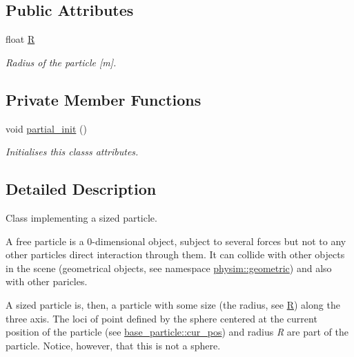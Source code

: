 \subsection*{Public Attributes}
\begin{DoxyCompactItemize}
\item 
\mbox{\label{classphysim_1_1particles_1_1sized__particle_ac67d5df84b91bb12152c8691dd43e98c}} 
float \hyperlink{classphysim_1_1particles_1_1sized__particle_ac67d5df84b91bb12152c8691dd43e98c}{R}
\begin{DoxyCompactList}\small\item\em Radius of the particle \mbox{[}m\mbox{]}. \end{DoxyCompactList}\end{DoxyCompactItemize}
\subsection*{Private Member Functions}
\begin{DoxyCompactItemize}
\item 
void \hyperlink{classphysim_1_1particles_1_1sized__particle_a30eee2e3b0c0cf9e6f56a21e10a424f3}{partial\+\_\+init} ()
\begin{DoxyCompactList}\small\item\em Initialises this class\textquotesingle{}s attributes. \end{DoxyCompactList}\end{DoxyCompactItemize}


\subsection{Detailed Description}
Class implementing a sized particle. 

A free particle is a 0-\/dimensional object, subject to several forces but not to any other particle\textquotesingle{}s direct interaction through them. It can collide with other objects in the scene (geometrical objects, see namespace \hyperlink{namespacephysim_1_1geometric}{physim\+::geometric}) and also with other paricles.

A sized particle is, then, a particle with some size (the radius, see \hyperlink{classphysim_1_1particles_1_1sized__particle_ac67d5df84b91bb12152c8691dd43e98c}{R}) along the three axis. The loci of point defined by the sphere centered at the current position of the particle (see \hyperlink{classphysim_1_1particles_1_1base__particle_a6298a121dea043741e5d3722386163c6}{base\+\_\+particle\+::cur\+\_\+pos}) and radius {\itshape R} are part of the particle. Notice, however, that this is not a sphere.

